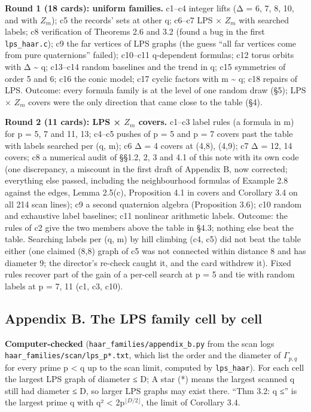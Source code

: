 \documentclass[
  10pt,
]{article}
\begin{document}
\textbf{Round 1 (18 cards): uniform families.} c1--c4 integer lifts (Δ =
6, 7, 8, 10, and with \(Z_{m}\)); c5 the records' sets at other q;
c6--c7 LPS × \(Z_{m}\) with searched labels; c8 verification of Theorems
2.6 and 3.2 (found a bug in the first \texttt{lps\_haar.c}); c9 the far
vertices of LPS graphs (the guess ``all far vertices come from pure
quaternions'' failed); c10--c11 q-dependent formulas; c12 torus orbits
with Δ \textasciitilde{} q; c13--c14 random baselines and the trend in
q; c15 symmetries of order 5 and 6; c16 the conic model; c17 cyclic
factors with m \textasciitilde{} q; c18 repairs of LPS. Outcome: every
formula family is at the level of one random draw (§5); LPS × \(Z_{m}\)
covers were the only direction that came close to the table (§4).

\textbf{Round 2 (11 cards): LPS × \(Z_{m}\) covers.} c1--c3 label rules
(a formula in m) for p = 5, 7 and 11, 13; c4--c5 pushes of p = 5 and p =
7 covers past the table with labels searched per (q, m); c6 Δ = 4 covers
at (4,8), (4,9); c7 Δ = 12, 14 covers; c8 a numerical audit of §§1.2, 2,
3 and 4.1 of this note with its own code (one discrepancy, a miscount in
the first draft of Appendix B, now corrected; everything else passed,
including the neighbourhood formulas of Example 2.8 against the edges,
Lemma 2.5(c), Proposition 4.1 in covers and Corollary 3.4 on all 214
scan lines); c9 a second quaternion algebra (Proposition 3.6); c10
random and exhaustive label baselines; c11 nonlinear arithmetic labels.
Outcome: the rules of c2 give the two members above the table in §4.3;
nothing else beat the table. Searching labels per (q, m) by hill
climbing (c4, c5) did not beat the table either (one claimed (8,8) graph
of c5 was not connected within distance 8 and has diameter 9; the
director's re-check caught it, and the card withdrew it). Fixed rules
recover part of the gain of a per-cell search at p = 5 and tie with
random labels at p = 7, 11 (c1, c3, c10).

\hypertarget{appendix-b.-the-lps-family-cell-by-cell}{%
\subsection{Appendix B. The LPS family cell by
cell}\label{appendix-b.-the-lps-family-cell-by-cell}}

\textbf{Computer-checked} (\texttt{haar\_families/appendix\_b.py} from
the scan logs \texttt{haar\_families/scan/lps\_p*.txt}, which list the
order and the diameter of \(Γ_{p,q}\) for every prime p \textless{} q up
to the scan limit, computed by \texttt{lps\_haar}). For each cell the
largest LPS graph of diameter ≤ D; A star (*) means the largest scanned
q still had diameter ≤ D, so larger LPS graphs may exist there. ``Thm
3.2: q ≤'' is the largest prime q with q² \textless{} 2p\(^{⌊D/2⌋}\),
the limit of Corollary 3.4.
\end{document}

